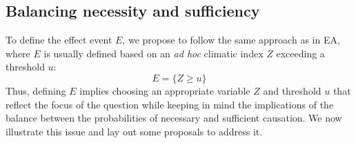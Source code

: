 \documentclass[12pt]{article}
\begin{document}
\subsection{Balancing necessity and sufficiency}

To define the effect event $E$, %
we propose to follow the same approach as in EA, where $E$ is usually defined based on an \textit{ad hoc} climatic index $Z$ exceeding a threshold $u$:
\begin{equation}
\label{defev}
E=\{Z\geq u\}
\end{equation}
Thus, defining $E$ implies choosing an appropriate variable $Z$ and threshold $u$ that reflect the focus of the question while keeping in mind the implications of the balance between the probabilities of necessary and sufficient causation. We now illustrate this issue and lay out some proposals to address it.
 
\end{document}
